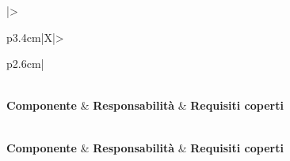 \renewcommand{\arraystretch}{1.3}
\begin{xltabular}{\textwidth}{|>{\raggedright\arraybackslash\small}p{3.4cm}|X|>{\raggedright\arraybackslash\small}p{2.6cm}|}
	\caption{Tracciamento Componenti $\rightarrow$ Requisiti} \label{tab:tracciamento-componenti} \\
	\hline
	\textbf{Componente} & \textbf{Responsabilità} & \textbf{Requisiti coperti} \\
	\hline
	\endfirsthead

	 \\
	\hline
	\textbf{Componente} & \textbf{Responsabilità} & \textbf{Requisiti coperti} \\
	\hline
	\endhead

	\hline
	 \\
	\hline
	\endfoot

	\hline
	\endlastfoot


\end{xltabular}
